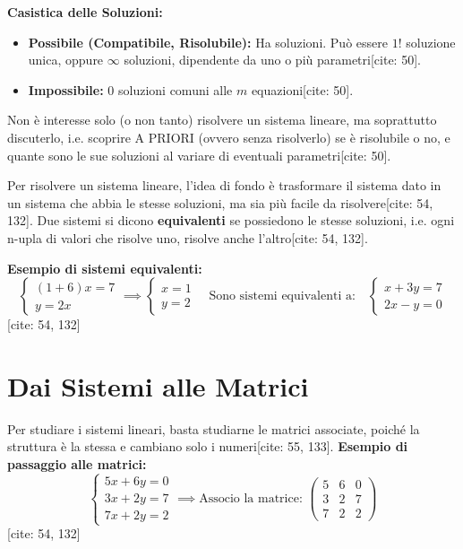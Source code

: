\documentclass[11pt,a4paper]{article}
\begin{document}
\textbf{Casistica delle Soluzioni:}
\begin{itemize}
    \item \textbf{Possibile (Compatibile, Risolubile):} Ha soluzioni. Può essere $1!$ soluzione unica, oppure $\infty$ soluzioni, dipendente da uno o più parametri[cite: 50].
    \item \textbf{Impossibile:} $0$ soluzioni comuni alle $m$ equazioni[cite: 50].
\end{itemize}
Non è interesse solo (o non tanto) risolvere un sistema lineare, ma soprattutto discuterlo, i.e. scoprire A PRIORI (ovvero senza risolverlo) se è risolubile o no, e quante sono le sue soluzioni al variare di eventuali parametri[cite: 50].

\begin{concept}
Per risolvere un sistema lineare, l'idea di fondo è trasformare il sistema dato in un sistema che abbia le stesse soluzioni, ma sia più facile da risolvere[cite: 54, 132].
Due sistemi si dicono \textbf{equivalenti} se possiedono le stesse soluzioni, i.e. ogni n-upla di valori che risolve uno, risolve anche l'altro[cite: 54, 132].

\textbf{Esempio di sistemi equivalenti:}
$$
\begin{cases} (1+6)x = 7 \\ y = 2x \end{cases} \implies \begin{cases} x = 1 \\ y = 2 \end{cases}
\quad \text{Sono sistemi equivalenti a:} \quad
\begin{cases} x + 3y = 7 \\ 2x - y = 0 \end{cases}
$$
[cite: 54, 132]
\end{concept}

\section{Dai Sistemi alle Matrici}
Per studiare i sistemi lineari, basta studiarne le matrici associate, poiché la struttura è la stessa e cambiano solo i numeri[cite: 55, 133].
\textbf{Esempio di passaggio alle matrici:}
$$
\begin{cases}
5x + 6y = 0 \\
3x + 2y = 7 \\
7x + 2y = 2
\end{cases}
\implies
\text{Associo la matrice: }
\begin{pmatrix}
5 & 6 & 0 \\
3 & 2 & 7 \\
7 & 2 & 2
\end{pmatrix}
$$
[cite: 54, 132]
\end{document}
